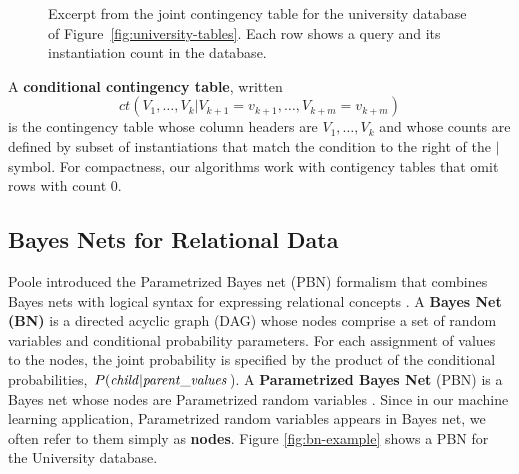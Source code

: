 \documentclass{vldb}
\newcommand{\ct}{\mathit{ct}}
\begin{document}
\begin{figure}[htbp]
\begin{center}
\caption{Excerpt from the joint contingency table for the university database of Figure~\ref{fig:university-tables}. %
Each row shows a query and its instantiation count in the database.
\label{fig:ct}}
\end{center}
\end{figure}

A \textbf{conditional contingency table}, written $$\ct(V_{1},\ldots,V_{k}|V_{k+1} = v_{k+1},\ldots, V_{k+m} = v_{k+m})$$
is the contingency table whose column headers are $V_{1},\ldots,V_{k}$ and whose counts are  defined by subset of instantiations that match the condition to the right of the $\vert$ symbol.  %
For compactness, our algorithms work with contigency tables that omit rows with count 0.

\subsection{Bayes Nets for Relational Data}

Poole introduced the Parametrized Bayes net (PBN) formalism that combines Bayes nets with logical syntax for expressing relational concepts \cite{Poole2003}. A {\bf Bayes Net (BN)} is a directed acyclic graph (DAG) whose nodes comprise a set of random variables and conditional probability parameters.
For each assignment of values to the nodes, the joint probability 
is specified by the product of the conditional probabilities, $P(\it{child}|\it{parent\_values}$). A \textbf{Parametrized Bayes Net} (PBN) is a Bayes net whose nodes are Parametrized random variables \cite{Poole2003}. 
Since in our machine learning application, Parametrized random variables appears in Bayes net, we often refer to them simply as \textbf{nodes}. Figure \ref{fig:bn-example} shows a PBN for the University database.
\end{document}
